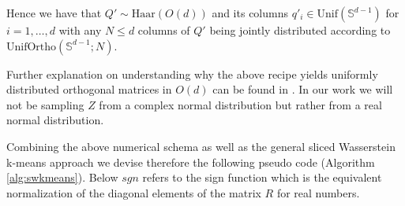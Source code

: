 \documentclass[12pt,a4paper]{report}
\begin{document}
Hence we have that $Q'  \sim \text{Haar}(O(d))$ and its columns $q'_i \in \text{Unif}(\mathbb{S}^{d-1})$ for $i = 1, \dots, d$ with any $N\leq d $ columns of $Q'$ being jointly distributed according to $\text{UnifOrtho}(\mathbb{S}^{d-1}; N)$.


Further explanation on understanding why the above recipe yields uniformly distributed orthogonal matrices in $O(d)$ can be found in \cite{Mezzadri2007}.
In our work we will not be sampling $Z$ from a complex normal distribution but rather from a real normal distribution.

Combining the above numerical schema \cite{RowlandEtAl2019,Mezzadri2007} as well as the general sliced Wasserstein k-means approach \cite{LuanHamp2025} we devise therefore the following pseudo code (Algorithm \ref{alg:swkmeans}). 
Below $\textit{sgn}$ refers to the sign function which is the equivalent normalization of the diagonal elements of the matrix $R$ for real numbers. 
\end{document}
